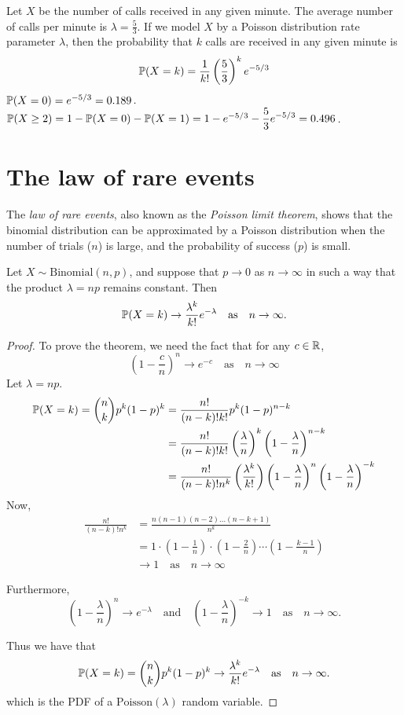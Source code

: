 \begin{solution}
Let $X$ be the number of calls received in any given minute. The average number of calls per minute is $\lambda=\frac{5}{3}$. If we model $X$ by a Poisson distribution rate parameter $\lambda$, then the probability that $k$ calls are received in any given minute is
\[
\mathbb{P}(X=k) = \frac{1}{k!}\left(\frac{5}{3}\right)^ke^{-5/3}
\]
\ben
\it $\mathbb{P}(X=0) = e^{-5/3} = 0.189$.
\it $\mathbb{P}(X\geq 2) = 1 - \mathbb{P}(X=0) - \mathbb{P}(X=1) = 1 - e^{-5/3} - \displaystyle\frac{5}{3}e^{-5/3} = 0.496$.
\een
\end{solution}

\section{The law of rare events}
The \emph{law of rare events}, also known as the \emph{Poisson limit theorem}, shows that the binomial distribution can be approximated by a Poisson distribution when the number of trials ($n$) is large, and the probability of success ($p$) is small.

\begin{theorem}
Let $X\sim\text{Binomial}(n,p)$, and suppose that $p\to 0$ as $n\to\infty$ in such a way that the product $\lambda=np$ remains constant. Then 
\[
\mathbb{P}(X=k)\to \frac{\lambda^k}{k!}e^{-\lambda} \quad\text{as}\quad n\to\infty.
\]
\end{theorem}

\begin{proof}
To prove the theorem, we need the fact that for any $c\in\mathbb{R}$,
\[
\left(1-\frac{c}{n}\right)^n \to e^{-c}\quad\text{as}\quad n\to\infty
\]
Let $\lambda=np$.
\begin{align*}
\mathbb{P}(X=k) = \binom{n}{k}p^k(1-p)^k 
	& = \frac{n!}{(n-k)!k!} p^k (1-p)^{n-k} \\
	& = \frac{n!}{(n-k)!k!} \left(\frac{\lambda}{n}\right)^k \left(1-\frac{\lambda}{n}\right)^{n-k} \\
	& =  \frac{n!}{(n-k)!n^k}\left(\frac{\lambda^k}{k!}\right) \left(1-\frac{\lambda}{n}\right)^n \left(1-\frac{\lambda}{n}\right)^{-k}
\end{align*}
Now,
\begin{align*}
\frac{n!}{(n-k)!n^k} 
	& = \frac{n(n-1)(n-2)\ldots(n-k+1)}{n^k} \\
	& = 1\cdot\left(1-\frac{1}{n}\right)\cdot\left(1-\frac{2}{n}\right)\cdots\left(1-\frac{k-1}{n}\right) \\
	& \to 1 \quad\text{as}\quad n\to\infty 
\end{align*}

Furthermore,
\[
\left(1-\frac{\lambda}{n}\right)^n \to e^{-\lambda} \quad\text{and}\quad \left(1-\frac{\lambda}{n}\right)^{-k} \to 1 \quad\text{as}\quad n\to\infty.
\]

Thus we have that 
\[
\mathbb{P}(X=k) = \binom{n}{k}p^k(1-p)^k \to \frac{\lambda^k}{k!} e^{-\lambda}\quad\text{as}\quad n\to\infty.
\]
which is the PDF of a $\text{Poisson}(\lambda)$ random variable.
\end{proof}

